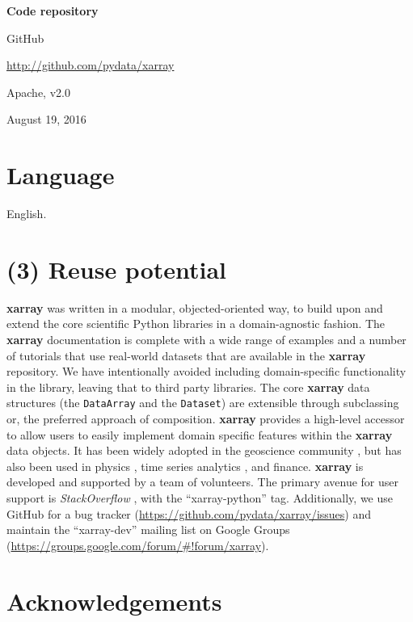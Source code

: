 \documentclass{jors}
\begin{document}
{\bf Code repository}

\begin{description}[noitemsep,topsep=0pt]
	\item[Name:] GitHub
	\item[Identifier:] \url{http://github.com/pydata/xarray}
	\item[Licence:] Apache, v2.0
	\item[Date published:] August 19, 2016
\end{description}

\section*{Language}

English.

\section*{(3) Reuse potential}

\textbf{xarray} was written in a modular, objected-oriented way, to build upon and extend the core scientific Python libraries in a domain-agnostic fashion.
The \textbf{xarray} documentation is complete with a wide range of examples and a number of tutorials that use real-world datasets that are available in the \textbf{xarray} repository.
We have intentionally avoided including domain-specific functionality in the library, leaving that to third party libraries.
The core \textbf{xarray} data structures (the \verb|DataArray| and the \verb|Dataset|) are extensible through subclassing or, the preferred approach of composition.
\textbf{xarray} provides a high-level accessor to allow users to easily implement domain specific features within the \textbf{xarray} data objects.
It has been widely adopted in the geoscience community \citep[e.g.][]{xgcm,Dawson_2016a,Dawson_2016b}, but has also been used in physics \citep[e.g.][]{pycalphad}, time series analytics \citep{cesium}, and finance.
\textbf{xarray} is developed and supported by a team of volunteers.
The primary avenue for user support is \textit{StackOverflow} \citep{stackoverflow}, with the ``xarray-python'' tag.
Additionally, we use GitHub for a bug tracker (\url{https://github.com/pydata/xarray/issues}) and maintain the ``xarray-dev'' mailing list on Google Groups (\url{https://groups.google.com/forum/#!forum/xarray}).

\section*{Acknowledgements}
\end{document}
